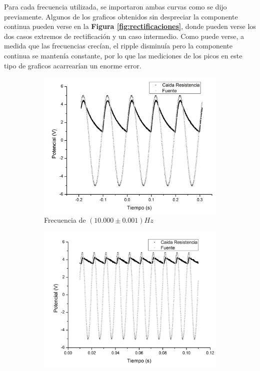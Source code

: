 \documentclass[11pt,a4paper]{article}
\begin{document}
Para cada frecuencia utilizada, se importaron ambas curvas como se dijo previamente. Algunos de los graficos obtenidos sin despreciar la componente continua pueden verse en la \textbf{Figura \ref{fig:rectificaciones}}, donde pueden verse los dos casos extremos de rectificación y un caso intermedio. Como puede verse, a medida que las frecuencias crecían, el ripple disminuía pero la componente continua se mantenía constante, por lo que las mediciones de los picos en este tipo de graficos acarrearían un enorme error. 

\begin{figure}[h]
\begin{subfigure}{0.33\textwidth}
\includegraphics[scale=0.23]{Rectificacion_10hz}
  \caption{Frecuencia de $(10.000\pm0.001)Hz$}
  \label{subfig:rec_10}
\end{subfigure}
\begin{subfigure}{0.33\textwidth}
\includegraphics[scale=0.23]{Rectificacion_100hz}

\end{subfigure}
\end{figure}
\end{document}
